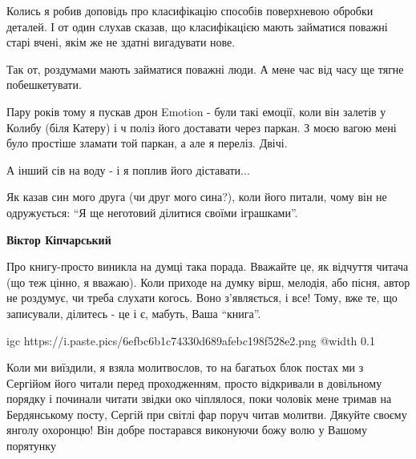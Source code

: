 \begin{itemize}
Колись я робив доповідь про класифікацію способів поверхневою обробки деталей.
І от один слухав сказав, що класифікацією мають займатися поважні старі вчені,
якім же не здатні вигадувати нове.

Так от, роздумами мають займатися поважні люди. А мене час від часу ще тягне побешкетувати.

Пару років тому я пускав дрон Emotion - були такі емоції, коли він залетів у
Колибу (біля Катеру) і ч поліз його доставати через паркан. З моєю вагою мені
було простіше зламати той паркан, а але я переліз. Двічі.

А інший сів на воду - і я поплив його діставати...

Як казав син мого друга (чи друг мого сина?), коли його питали, чому він не
одружується: \enquote{Я ще неготовий ділитися своїми іграшками}.

\textbf{Віктор Кіпчарський} 

Про книгу-просто виникла на думці така порада. Вважайте це, як відчуття читача
(що теж цінно, я вважаю). Коли приходе на думку вірш, мелодія, або пісня, автор не
роздумує, чи треба слухати когось. Воно з'являється, і все! Тому, вже те, що
записували, ділитесь - це і є, мабуть, Ваша \enquote{книга}.

\end{itemize} %


\ifcmt
  igc https://i.paste.pics/6efbc6b1c74330d689afebc198f528e2.png
	@width 0.1
\fi


Коли ми виїздили, я взяла молитвослов, то на багатьох блок постах ми з Сергійом
його читали перед проходженням, просто відкривали в довільному порядку і
починали читати звідки око чіплялося, поки чоловік мене тримав на Бердянському
посту, Сергій при світлі фар поруч читав молитви. Дякуйте своєму янголу
охоронцю! Він добре постарався виконуючи божу волю у Вашому порятунку

